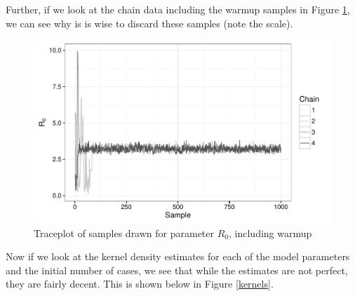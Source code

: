 \documentclass[12pt]{article}
\begin{document}
    Further, if we look at the chain data including the warmup samples in Figure \ref{traceplot2}, we can see why is is wise to discard these samples (note the scale).

    \begin{figure}[H]
        \centering
        \includegraphics[width=\textwidth]{./images/traceplotR0_inc.pdf}
        \caption{Traceplot of samples drawn for parameter $R_0$, including warmup}
        \label{traceplot2}
    \end{figure}

    Now if we look at the kernel density estimates for each of the model parameters and the initial number of cases, we see that while the estimates are not perfect, they are fairly decent. This is shown below in Figure \ref{kernels}.
\end{document}
